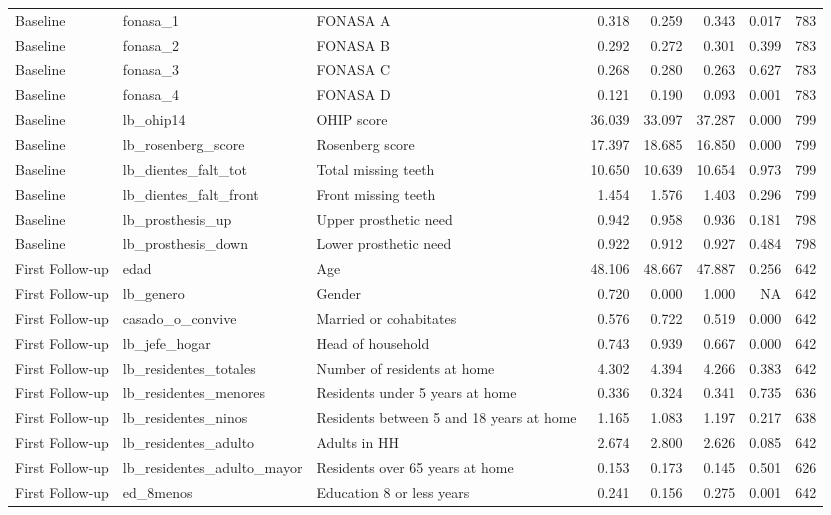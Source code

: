 \begin{table}
\begin{tabular}[t]{lllrrrrr}
Baseline & fonasa\_1 & FONASA A & 0.318 & 0.259 & 0.343 & 0.017 & 783\\
Baseline & fonasa\_2 & FONASA B & 0.292 & 0.272 & 0.301 & 0.399 & 783\\
Baseline & fonasa\_3 & FONASA C & 0.268 & 0.280 & 0.263 & 0.627 & 783\\
\addlinespace
Baseline & fonasa\_4 & FONASA D & 0.121 & 0.190 & 0.093 & 0.001 & 783\\
Baseline & lb\_ohip14 & OHIP score & 36.039 & 33.097 & 37.287 & 0.000 & 799\\
Baseline & lb\_rosenberg\_score & Rosenberg score & 17.397 & 18.685 & 16.850 & 0.000 & 799\\
Baseline & lb\_dientes\_falt\_tot & Total missing teeth & 10.650 & 10.639 & 10.654 & 0.973 & 799\\
Baseline & lb\_dientes\_falt\_front & Front missing teeth & 1.454 & 1.576 & 1.403 & 0.296 & 799\\
\addlinespace
Baseline & lb\_prosthesis\_up & Upper prosthetic need & 0.942 & 0.958 & 0.936 & 0.181 & 798\\
Baseline & lb\_prosthesis\_down & Lower prosthetic need & 0.922 & 0.912 & 0.927 & 0.484 & 798\\
First Follow-up & edad & Age & 48.106 & 48.667 & 47.887 & 0.256 & 642\\
First Follow-up & lb\_genero & Gender & 0.720 & 0.000 & 1.000 & NA & 642\\
First Follow-up & casado\_o\_convive & Married or cohabitates & 0.576 & 0.722 & 0.519 & 0.000 & 642\\
\addlinespace
First Follow-up & lb\_jefe\_hogar & Head of household & 0.743 & 0.939 & 0.667 & 0.000 & 642\\
First Follow-up & lb\_residentes\_totales & Number of residents at home & 4.302 & 4.394 & 4.266 & 0.383 & 642\\
First Follow-up & lb\_residentes\_menores & Residents under 5 years at home & 0.336 & 0.324 & 0.341 & 0.735 & 636\\
First Follow-up & lb\_residentes\_ninos & Residents between 5 and 18 years at home & 1.165 & 1.083 & 1.197 & 0.217 & 638\\
First Follow-up & lb\_residentes\_adulto & Adults in HH & 2.674 & 2.800 & 2.626 & 0.085 & 642\\
\addlinespace
First Follow-up & lb\_residentes\_adulto\_mayor & Residents over 65 years at home & 0.153 & 0.173 & 0.145 & 0.501 & 626\\
First Follow-up & ed\_8menos & Education 8 or less years & 0.241 & 0.156 & 0.275 & 0.001 & 642\\

\end{tabular}
\end{table}
